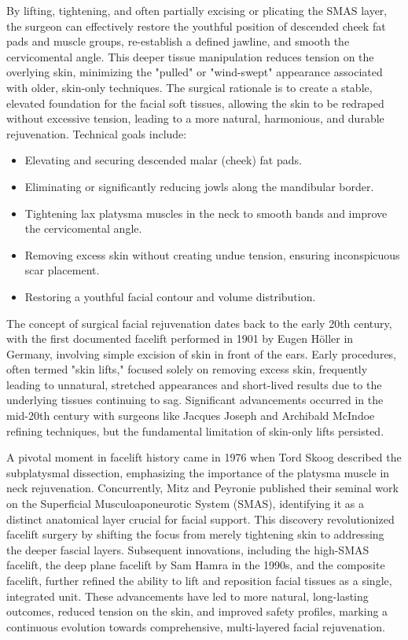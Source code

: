 By lifting, tightening, and often partially excising or plicating the SMAS layer, the surgeon can effectively restore the youthful position of descended cheek fat pads and muscle groups, re-establish a defined jawline, and smooth the cervicomental angle. This deeper tissue manipulation reduces tension on the overlying skin, minimizing the "pulled" or "wind-swept" appearance associated with older, skin-only techniques. The surgical rationale is to create a stable, elevated foundation for the facial soft tissues, allowing the skin to be redraped without excessive tension, leading to a more natural, harmonious, and durable rejuvenation. Technical goals include:
\begin{itemize}
  \item Elevating and securing descended malar (cheek) fat pads.
  \item Eliminating or significantly reducing jowls along the mandibular border.
  \item Tightening lax platysma muscles in the neck to smooth bands and improve the cervicomental angle.
  \item Removing excess skin without creating undue tension, ensuring inconspicuous scar placement.
  \item Restoring a youthful facial contour and volume distribution.
\end{itemize}

The concept of surgical facial rejuvenation dates back to the early 20th century, with the first documented facelift performed in 1901 by Eugen H\"oller in Germany, involving simple excision of skin in front of the ears. Early procedures, often termed "skin lifts," focused solely on removing excess skin, frequently leading to unnatural, stretched appearances and short-lived results due to the underlying tissues continuing to sag. Significant advancements occurred in the mid-20th century with surgeons like Jacques Joseph and Archibald McIndoe refining techniques, but the fundamental limitation of skin-only lifts persisted.

A pivotal moment in facelift history came in 1976 when Tord Skoog described the subplatysmal dissection, emphasizing the importance of the platysma muscle in neck rejuvenation. Concurrently, Mitz and Peyronie published their seminal work on the Superficial Musculoaponeurotic System (SMAS), identifying it as a distinct anatomical layer crucial for facial support. This discovery revolutionized facelift surgery by shifting the focus from merely tightening skin to addressing the deeper fascial layers. Subsequent innovations, including the high-SMAS facelift, the deep plane facelift by Sam Hamra in the 1990s, and the composite facelift, further refined the ability to lift and reposition facial tissues as a single, integrated unit. These advancements have led to more natural, long-lasting outcomes, reduced tension on the skin, and improved safety profiles, marking a continuous evolution towards comprehensive, multi-layered facial rejuvenation.

